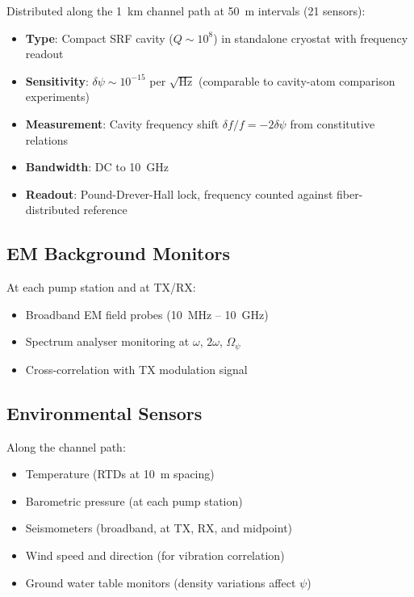 \documentclass[11pt,letterpaper]{article}
\begin{document}
Distributed along the 1~km channel path at 50~m intervals (21 sensors):

\begin{itemize}
\item \textbf{Type}: Compact SRF cavity ($Q \sim 10^8$) in
standalone cryostat with frequency readout
\item \textbf{Sensitivity}: $\delta\psi \sim 10^{-15}$ per
$\sqrt{\text{Hz}}$ (comparable to cavity-atom comparison experiments)
\item \textbf{Measurement}: Cavity frequency shift
$\delta f/f = -2\delta\psi$ from constitutive relations
\item \textbf{Bandwidth}: DC to 10~GHz
\item \textbf{Readout}: Pound-Drever-Hall lock, frequency counted
against fiber-distributed reference
\end{itemize}

\subsection{EM Background Monitors}

At each pump station and at TX/RX:
\begin{itemize}
\item Broadband EM field probes (10~MHz -- 10~GHz)
\item Spectrum analyser monitoring at $\omega$, $2\omega$, $\Omega_\psi$
\item Cross-correlation with TX modulation signal
\end{itemize}

\subsection{Environmental Sensors}

Along the channel path:
\begin{itemize}
\item Temperature (RTDs at 10~m spacing)
\item Barometric pressure (at each pump station)
\item Seismometers (broadband, at TX, RX, and midpoint)
\item Wind speed and direction (for vibration correlation)
\item Ground water table monitors (density variations affect $\psi$)
\end{itemize}

\end{document}

